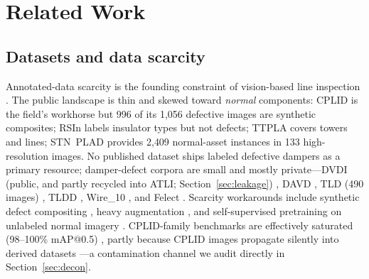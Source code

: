 \documentclass[conference]{IEEEtran}
\makeatletter
\newcommand{\map}{mAP@0.5}
\makeatother
\begin{document}
\section{Related Work}
\label{sec:related}

\subsection{Datasets and data scarcity}
Annotated-data scarcity is the founding constraint of vision-based line inspection \cite{nguyen2018autonomous,liu2020review,yang2020powerline,faisal2025powerline}. The public landscape is thin and skewed toward \emph{normal} components: CPLID \cite{tao2020insulator} is the field's workhorse but 996 of its 1{,}056 defective images are synthetic composites; RSIn \cite{shuang2023rsin} labels insulator types but not defects; TTPLA \cite{abdelfattah2020ttpla} covers towers and lines; STN~PLAD \cite{vieiraesilva2021stnplad} provides 2{,}409 normal-asset instances in 133 high-resolution images. No published dataset ships labeled defective dampers as a primary resource; damper-defect corpora are small and mostly private---DVDI (public, and partly recycled into ATLI; Section~\ref{sec:leakage}) \cite{bao2022bcyolo}, DAVD \cite{bao2021pmayolo}, TLD (490 images) \cite{zhang2024dsanet}, TLDD \cite{su2024cessd}, Wire\_10 \cite{liang2020wire10}, and Felect \cite{maduako2022felect}. Scarcity workarounds include synthetic defect compositing \cite{tao2020insulator,qiu2022lightweightyolov4,han2020eagle,gao2025zeroshot}, heavy augmentation \cite{sadykova2020inyolo,li2020birdnesttower}, and self-supervised pretraining on unlabeled normal imagery \cite{zhang2024hcvit}. CPLID-family benchmarks are effectively saturated (98--100\% \map{}) \cite{vieiraesilva2021stnplad,pradeep2025insulator}, partly because CPLID images propagate silently into derived datasets \cite{shuang2023rsin,qiu2022lightweightyolov4,su2024cessd}---a contamination channel we audit directly in Section~\ref{sec:decon}.
\end{document}
